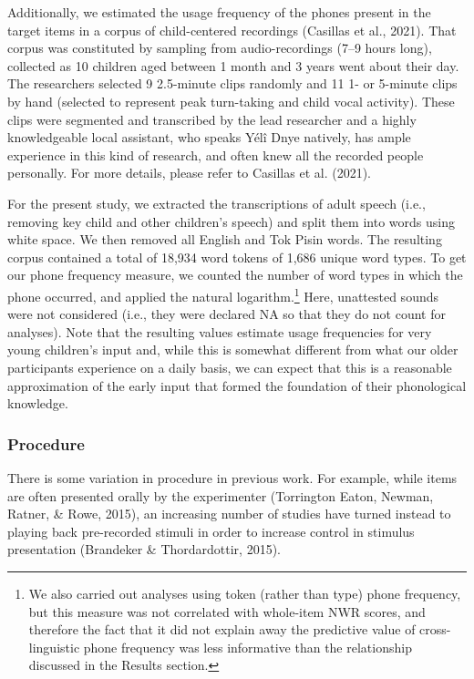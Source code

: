 \documentclass[
  american,
  ,man,floatsintext]{apa6}
\begin{document}
Additionally, we estimated the usage frequency of the phones present in the target items in a corpus of child-centered recordings (Casillas et al., 2021). That corpus was constituted by sampling from audio-recordings (7--9 hours long), collected as 10 children aged between 1 month and 3 years went about their day. The researchers selected 9 2.5-minute clips randomly and 11 1- or 5-minute clips by hand (selected to represent peak turn-taking and child vocal activity). These clips were segmented and transcribed by the lead researcher and a highly knowledgeable local assistant, who speaks Yélî Dnye natively, has ample experience in this kind of research, and often knew all the recorded people personally. For more details, please refer to Casillas et al. (2021).

For the present study, we extracted the transcriptions of adult speech (i.e., removing key child and other children's speech) and split them into words using white space. We then removed all English and Tok Pisin words. The resulting corpus contained a total of 18,934 word tokens of 1,686 unique word types. To get our phone frequency measure, we counted the number of word types in which the phone occurred, and applied the natural logarithm.\footnote{We also carried out analyses using token (rather than type) phone frequency, but this measure was not correlated with whole-item NWR scores, and therefore the fact that it did not explain away the predictive value of cross-linguistic phone frequency was less informative than the relationship discussed in the Results section.} Here, unattested sounds were not considered (i.e., they were declared NA so that they do not count for analyses). Note that the resulting values estimate usage frequencies for very young children's input and, while this is somewhat different from what our older participants experience on a daily basis, we can expect that this is a reasonable approximation of the early input that formed the foundation of their phonological knowledge.

\hypertarget{procedure}{%
\subsubsection{Procedure}\label{procedure}}

There is some variation in procedure in previous work. For example, while items are often presented orally by the experimenter (Torrington Eaton, Newman, Ratner, \& Rowe, 2015), an increasing number of studies have turned instead to playing back pre-recorded stimuli in order to increase control in stimulus presentation (Brandeker \& Thordardottir, 2015).
\end{document}
